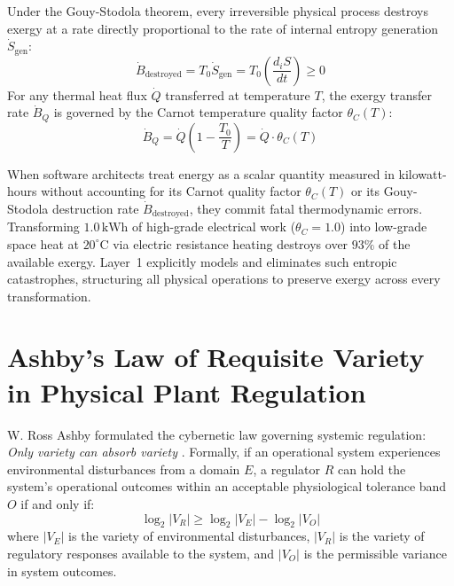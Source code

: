 Under the Gouy-Stodola theorem, every irreversible physical process destroys exergy at a rate directly proportional to the rate of internal entropy generation $\dot{S}_{\mathrm{gen}}$:
\begin{equation}
\dot{B}_{\mathrm{destroyed}} = T_0 \dot{S}_{\mathrm{gen}} = T_0 \left(\frac{d_iS}{dt}\right) \ge 0
\label{eq:gouy_stodola}
\end{equation}
For any thermal heat flux $\dot{Q}$ transferred at temperature $T$, the exergy transfer rate $\dot{B}_Q$ is governed by the Carnot temperature quality factor $\theta_C(T)$:
\begin{equation}
\dot{B}_Q = \dot{Q} \left(1 - \frac{T_0}{T}\right) = \dot{Q} \cdot \theta_C(T)
\label{eq:carnot_quality_factor}
\end{equation}

When software architects treat energy as a scalar quantity measured in kilowatt-hours without accounting for its Carnot quality factor $\theta_C(T)$ or its Gouy-Stodola destruction rate $\dot{B}_{\mathrm{destroyed}}$, they commit fatal thermodynamic errors. Transforming $1.0\,\mathrm{kWh}$ of high-grade electrical work ($\theta_C = 1.0$) into low-grade space heat at $20^\circ\mathrm{C}$ via electric resistance heating destroys over $93\%$ of the available exergy. Layer~1 explicitly models and eliminates such entropic catastrophes, structuring all physical operations to preserve exergy across every transformation.

\section{Ashby's Law of Requisite Variety in Physical Plant Regulation}
\label{sec:intro_ashby}

W. Ross Ashby formulated the cybernetic law governing systemic regulation: \textit{Only variety can absorb variety} \cite{ashby1956cybernetics}. Formally, if an operational system experiences environmental disturbances from a domain $E$, a regulator $R$ can hold the system's operational outcomes within an acceptable physiological tolerance band $O$ if and only if:
\begin{equation}
\log_2 |V_R| \ge \log_2 |V_E| - \log_2 |V_O|
\label{eq:ashby_requisite_variety}
\end{equation}
where $|V_E|$ is the variety of environmental disturbances, $|V_R|$ is the variety of regulatory responses available to the system, and $|V_O|$ is the permissible variance in system outcomes.

